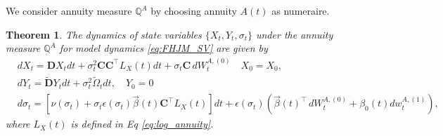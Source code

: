 \documentclass[pdftex,11pt,a4paper] {article}
\newtheorem{theorem}{Theorem}[section]
\begin{document}
We consider annuity measure $\mathbb{Q}^A$ by choosing annuity $A(t)$ as numeraire. 

\begin{theorem}
The dynamics of state variables $\{X_t, Y_t, \sigma_t\}$ under the annuity measure $\mathbb{Q}^A$
for model dynamics \eqref{eq:FHJM_SV} are given by
\begin{equation}\label{eq:md_ann}
\begin{split}
&   dX_{t} = \mathbf{D} X_{t}dt  + \sigma_{t}^2 \mathbf{C}\mathbf{C}^\top L_X(t)dt+\sigma_{t}\mathbf{C}\,dW^{A,(0)}_{t} \quad X_0=X_0, \\
& dY_{t} = \tilde{\mathbf{D}}Y_{t}dt + \sigma_t^2\tilde\Omega_{t}dt,\quad Y_0=0 \\
&d\sigma_t=\left[\nu(\sigma_t)+\sigma_t\epsilon(\sigma_t)\vec\beta(t)\mathbf{C}^\top L_X(t)\right]dt+\epsilon(\sigma_t)\left(\vec{\beta}(t)^\top\,dW^{A,(0)}_t + \beta_{0}(t)dw^{A,(1)}_t\right),
\end{split}
\end{equation}
where $L_X(t)$ is defined in Eq \eqref{eq:log_annuity}.

\end{theorem}
\end{document}
